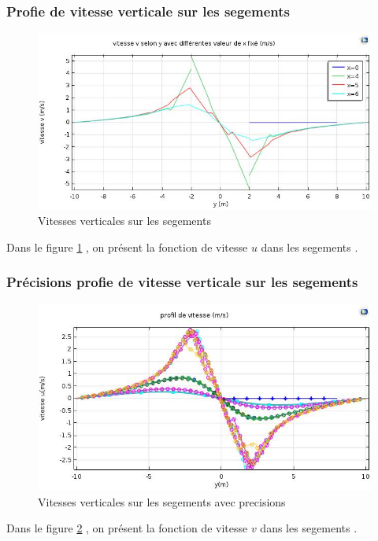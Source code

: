 \documentclass[a4paper,11pt]{report} %
\begin{document}
\subsubsection{Profie de vitesse verticale sur les segements }
\begin{figure}[!h]
\centering
\hspace*{0mm}\vfill
\begin{center} \includegraphics[width=1.\textwidth]{v_segment.jpg} \end{center}
\vfill\hspace*{0mm}
\caption{Vitesses verticales sur les segements}
\label{vitesse_v_sege}
\end{figure}\pagebreak
Dans le figure \ref{vitesse_v_sege} , on présent la fonction de vitesse $u$ dans les segements . 



\subsubsection{Précisions profie de vitesse verticale sur les segements }
\begin{figure}[!h]
\centering
\hspace*{0mm}\vfill
\begin{center} \includegraphics[width=1.\textwidth]{pre_v_segment.jpg} \end{center}
\vfill\hspace*{0mm}
\caption{Vitesses verticales sur les segements avec precisions}
\label{vitesse_v_sege_hh}
\end{figure}\pagebreak
Dans le figure \ref{vitesse_v_sege_hh} , on présent la fonction de vitesse $v$ dans les segements . 
\end{document}
